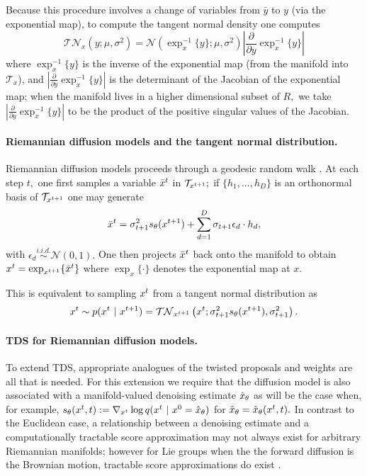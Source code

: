 Because this procedure involves a change of variables from $\bar y$ to $y$ (via the exponential map),
to compute the tangent normal density one computes 
\begin{equation}\label{eq:TN_density}
    \mathcal{TN}_{x}(y;\mu, \sigma^2) = \mathcal{N}(\exp^{-1}_x\{y\}; \mu,  \sigma^2) \left| \frac{\partial}{\partial y} \exp_x^{-1}\{y\}\right|
\end{equation}
where $\exp_x^{-1}\{y\}$ is the inverse of the exponential map (from the manifold into $\mathcal{T}_x$), 
and $\left| \frac{\partial}{\partial y} \exp_x^{-1}\{y\}\right|$ is the determinant of the Jacobian of the exponential map; when the manifold lives in a higher dimensional subset of $R,$ we take 
$\left| \frac{\partial}{\partial y} \exp_x^{-1}\{y\}\right|$ to be the product of the positive singular values of the Jacobian.

\paragraph{Riemannian diffusion models and the tangent normal distribution.}
Riemannian diffusion models proceeds through a geodesic random walk \citep{deriemannian}.
At each step $t,$
one first samples a variable $\bar x^{t}$ in $\mathcal{T}_{x^{t+1}};$
if $\{h_1, \dots, h_D\}$ is an orthonormal basis of $\mathcal{T}_{x^{t+1}}$
one may generate
\begin{align}
    \bar x^{t}  =\sigma_{t+1}^2 s_\theta(x^{t+1})+ \sum_{d=1}^D \sigma_{t+1} \epsilon_d \cdot h_d,
\end{align}
with $\epsilon_d\overset{i.i.d.}{\sim}\mathcal{N}(0, 1).$
One then projects $\bar x^{t}$ back onto the manifold to obtain
$x^{t} = \exp_{x^{t+1}}\{ \bar x^{t}\}$
where $\exp_{x}\{ \cdot \}$ denotes the exponential map at $x.$

This is equivalent to sampling $x^{t}$ from a tangent normal distribution as 
\begin{equation}\label{eqn:reverse_transition_unconditional_riemannian}
    x^{t} \sim p(x^{t} ~\vert~ x^{t+1}) = \mathcal{TN}_{x^{t+1}}\left(x^{t};\sigma_{t+1}^2 s_\theta(x^{t+1}),
\sigma_{t+1}^2 \right).
\end{equation}

\paragraph{TDS for Riemannian diffusion models.}
To extend TDS, appropriate analogues of the twisted proposals and weights are all that is needed.
For this extension we require that the diffusion model is also associated with a manifold-valued denoising estimate ${\hat x}_\theta$ as will be the case when, for example, $s_\theta(x^{t}, t) := \nabla_{x^{t}} \log q(x^{t} ~\vert~ x^{0}={\hat x}_\theta)$ for ${\hat x}_\theta = {\hat x}_\theta(x^{t}, t).$
In contrast to the Euclidean case, a relationship between a denoising estimate and a computationally tractable score approximation may not always exist for arbitrary Riemannian manifolds;
however for Lie groups when the the forward diffusion is the Brownian motion, tractable score approximations do exist \citep[Proposition 3.2]{yim2023se}.

